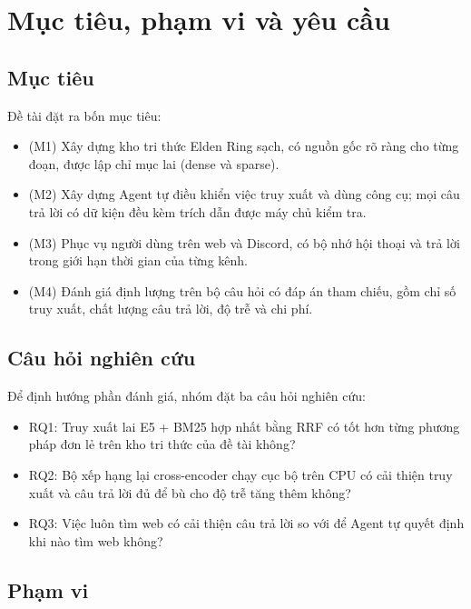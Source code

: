\section{Mục tiêu, phạm vi và yêu cầu}
\label{sec:goals}

\subsection{Mục tiêu}
\label{sec:objectives}

Đề tài đặt ra bốn mục tiêu:
\begin{itemize}
    \item (M1) Xây dựng kho tri thức Elden Ring sạch, có nguồn gốc rõ ràng cho từng đoạn, được lập chỉ mục lai (dense và sparse).
    \item (M2) Xây dựng Agent tự điều khiển việc truy xuất và dùng công cụ; mọi câu trả lời có dữ kiện đều kèm trích dẫn được máy chủ kiểm tra.
    \item (M3) Phục vụ người dùng trên web và Discord, có bộ nhớ hội thoại và trả lời trong giới hạn thời gian của từng kênh.
    \item (M4) Đánh giá định lượng trên bộ câu hỏi có đáp án tham chiếu, gồm chỉ số truy xuất, chất lượng câu trả lời, độ trễ và chi phí.
\end{itemize}

\subsection{Câu hỏi nghiên cứu}
\label{sec:rq}

Để định hướng phần đánh giá, nhóm đặt ba câu hỏi nghiên cứu:
\begin{itemize}
    \item RQ1: Truy xuất lai E5 + BM25 hợp nhất bằng RRF có tốt hơn từng phương pháp đơn lẻ trên kho tri thức của đề tài không?
    \item RQ2: Bộ xếp hạng lại cross-encoder chạy cục bộ trên CPU có cải thiện truy xuất và câu trả lời đủ để bù cho độ trễ tăng thêm không?
    \item RQ3: Việc luôn tìm web có cải thiện câu trả lời so với để Agent tự quyết định khi nào tìm web không?
\end{itemize}

\subsection{Phạm vi}
\label{sec:scope}

